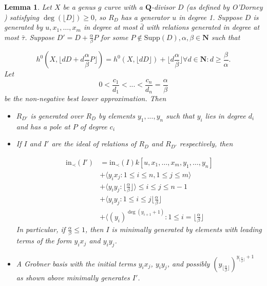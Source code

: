 \documentclass{amsart}
\theoremstyle{plain}
\newtheorem{lem}[thm]{Lemma}
\theoremstyle{definition}
\theoremstyle{remark}
\numberwithin{equation}{section}
\newcommand \Supp{\text{Supp}}
\newcommand \initial{\text{in}}
\begin{document}
\begin{lem}
\label{lem:deg1_sat_ind}
Let $X$ be a genus $g$ curve with a $\mathbf{Q}$-divisor $D$ (as
defined by O'Dorney )
satisfying $\deg(\lfloor{D}\rfloor)\ge 0$, so $R_D$ has a
generator $u$ in degree 1.  Suppose $D$ is generated by $
u, x_1, \ldots, x_m$ in degree at most $\bar{d}$ with relations generated 
in degree at most $\bar{\tau}$.  Suppose $D' = D + \frac{\alpha}{\beta} P$
for some $P \not \in \Supp(D), \alpha,\beta \in \mathbf{N}$ such
that

\begin{equation}
\label{eqn:deg1_sat_ind_dim}
	h^0(X, \lfloor{dD + d\frac{\alpha}{\beta} P \rfloor}) = h^0(X,\lfloor dD
	\rfloor) + \lfloor d\frac{\alpha} {\beta} \rfloor \forall d \in \mathbf{
	N} : d \ge \frac{\beta}{\alpha}.
\end{equation}
Let 
\[
	0<\frac{c_1}{d_1}<...<\frac{c_n}{d_n}=\frac{\alpha}{\beta}
\]
be the non-negative best lower approximation.
Then 
\begin{itemize}
\item $R_{D'}$ is generated over $R_D$ by elements $y_1,...,y_n$ such that $y_i$ lies in  
degree $d_i$ and has a pole at $P$ of degree $c_i$

\item If $I$ and $I'$ are the ideal of relations of $R_D$ and $R_{D'}$ respectively, then 

\begin{align*}
	\initial_\prec(I') &= \initial_\prec(I) k[u, x_1, \ldots, x_m, y_1, \ldots, y_n] \\
										 &+ \langle y_i x_j: 1 \le i \le n, 1 \le j \le m \rangle \\
										 &+ \langle y_i y_j: \lfloor \frac{\alpha}{\beta} \rfloor \rangle \le i \le j \le n-1 \\
										 &+ \langle y_i y_j: 1\le i\le j\lfloor \frac{\alpha}{\beta} \rfloor\\
										 &+ \langle (y_i)^{\deg(y_{i+1}+1)}: 1\le i=\lfloor \frac{\alpha}{\beta} \rfloor
\end{align*}
In particular, if $\frac{\alpha}{\beta}\le 1$, then $I$ is minimally generated by elements with leading terms of the form $y_ix_j$ and $y_iy_j$.
\item A Grobner basis with the initial terms $y_i x_j$, $y_iy_j$, and possibly $(y_{\lfloor \frac{\alpha}{\beta} \rfloor})^{y_{\lfloor \frac{\alpha}{\beta} \rfloor}+1}$ as shown above minimally generates $I'$.
\end{itemize}
\end{lem}
\end{document}
